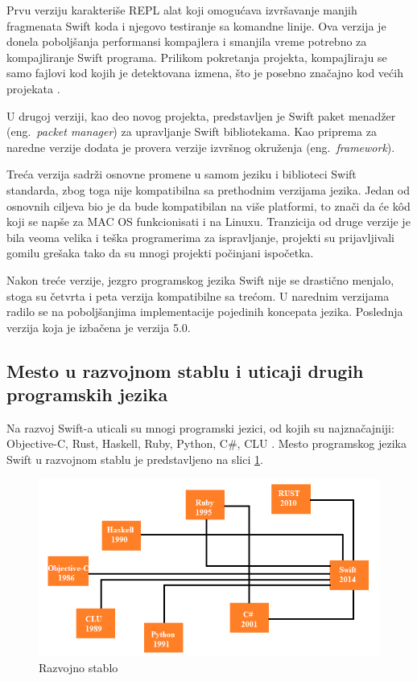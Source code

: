 \documentclass[a4paper]{article}
\begin{document}
Prvu verziju karakteriše REPL alat koji omogućava izvršavanje  manjih fragmenata Swift koda i njegovo testiranje sa komandne linije. Ova verzija je donela poboljšanja performansi kompajlera i smanjila vreme potrebno za kompajliranje Swift programa. Prilikom pokretanja projekta, kompajliraju se samo fajlovi kod kojih je detektovana izmena, što je posebno značajno kod većih projekata \cite{swiftdev_sajt}. 

U drugoj verziji, kao deo novog projekta, predstavljen je Swift paket menadžer (eng.~{\em packet manager}) za upravljanje Swift bibliotekama. Kao priprema za naredne verzije dodata je provera verzije izvršnog okruženja (eng.~{\em framework}). 

Treća verzija sadrži osnovne promene u samom jeziku i biblioteci Swift standarda, zbog toga nije kompatibilna sa prethodnim verzijama jezika. Jedan od osnovnih ciljeva bio je da bude kompatibilan na više platformi, to znači da će k\^{o}d koji se napše za MAC OS funkcionisati i na Linuxu. Tranzicija od druge verzije je bila veoma velika i teška programerima za ispravljanje, projekti su prijavljivali gomilu grešaka tako da su mnogi projekti počinjani ispočetka. 

Nakon treće verzije, jezgro programskog jezika Swift nije se drastično menjalo, stoga su četvrta i peta verzija kompatibilne sa trećom. U narednim verzijama radilo se na poboljšanjima implementacije pojedinih koncepata jezika. Poslednja verzija koja je izbačena je verzija 5.0.
  
\subsection{Mesto u razvojnom stablu i uticaji drugih programskih jezika}
\label{subsec:podnaslovRazvojnoStablo}
Na razvoj Swift-a uticali su mnogi programski jezici, od kojih su najznačajniji: Objective-C, Rust, Haskell, Ruby, Python, C\#, CLU \cite{chris_sajt}. Mesto programskog jezika Swift u razvojnom stablu je predstavljeno na slici \ref{fig:razvojno_stablo}.

\begin{figure}[h!]
\begin{center}
\includegraphics[scale=0.5]{razvojno_stablo.png}
\end{center}
\caption{Razvojno stablo}
\label{fig:razvojno_stablo}
\end{figure}
\end{document}
